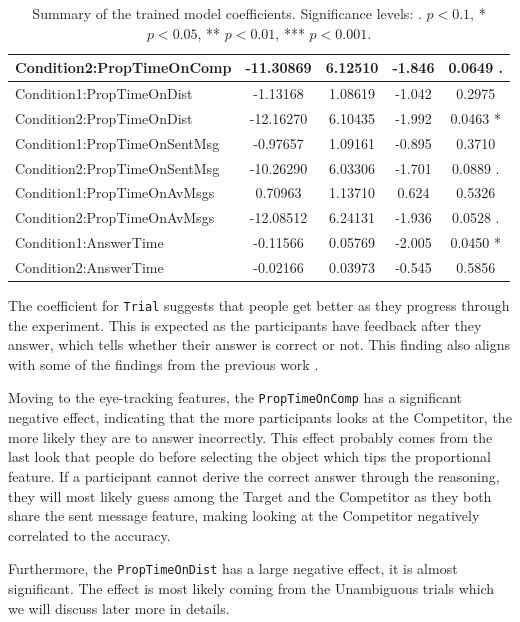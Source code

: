 \begin{table}[h!]
\begin{tabular}{|l|c|c|c|c|}
Condition2:PropTimeOnComp          & -11.30869 & 6.12510 & -1.846 & 0.0649 . \\ \hline
Condition1:PropTimeOnDist           & -1.13168 & 1.08619 & -1.042 & 0.2975 \\ \hline
Condition2:PropTimeOnDist          & -12.16270 & 6.10435 & -1.992 & 0.0463 * \\ \hline
Condition1:PropTimeOnSentMsg        & -0.97657 & 1.09161 & -0.895 & 0.3710 \\ \hline
Condition2:PropTimeOnSentMsg       & -10.26290 & 6.03306 & -1.701 & 0.0889 . \\ \hline
Condition1:PropTimeOnAvMsgs   & 0.70963 & 1.13710 & 0.624 & 0.5326 \\ \hline
Condition2:PropTimeOnAvMsgs & -12.08512 & 6.24131 & -1.936 & 0.0528 . \\ \hline
Condition1:AnswerTime               & -0.11566 & 0.05769 & -2.005 & 0.0450 * \\ \hline
Condition2:AnswerTime               & -0.02166 & 0.03973 & -0.545 & 0.5856 \\ \hline
\end{tabular}
\caption{Summary of the trained model coefficients. Significance levels: . $p < 0.1$, * $p < 0.05$, ** $p < 0.01$, *** $p < 0.001$.}
\label{tab:model_coefficients_acc}
\end{table}

The coefficient for \texttt{Trial} suggests that people get better as they progress through the experiment. This is expected as the participants have feedback after they answer, which tells whether their answer is correct or not. This finding also aligns with some of the findings from the previous work \citep{Mayn_2023, Mayn_2025}. 

Moving to the eye-tracking features, the \texttt{PropTimeOnComp} has a significant negative effect, indicating that the more participants looks at the Competitor, the more likely they are to answer incorrectly. This effect probably comes from the last look that people do before selecting the object which tips the proportional feature. If a participant cannot derive the correct answer through the reasoning, they will most likely guess among the Target and the Competitor as they both share the sent message feature, making looking at the Competitor negatively correlated to the accuracy.

Furthermore, the \texttt{PropTimeOnDist} has a large negative effect, it is almost significant. The effect is most likely coming from the Unambiguous trials which we will discuss later more in details. 

